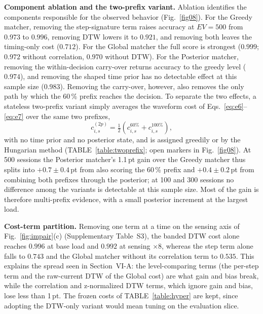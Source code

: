 \documentclass{ieeeaccess}
\newif\ifhighlight \highlightfalse
\DeclareRobustCommand{\revised}[1]{\ifhighlight{\color{blue}#1}\else{\color{.}#1}\fi}
\begin{document}
    \revised{\textbf{Component ablation and the two-prefix variant.}} Ablation identifies the components responsible for the observed behavior (Fig.~\ref{fig08})\revised{.
    For the Greedy matcher, removing the step-signature term raises accuracy at $EV = 500$ from $0.973$ to $0.996$, removing DTW lowers it to $0.921$, and removing both leaves the timing-only cost ($0.712$).
    For the Global matcher the full score is strongest ($0.999$; $0.972$ without correlation, $0.970$ without DTW).
    For the Posterior matcher, removing the within-decision carry-over returns accuracy to the greedy level ($0.974$), and removing the shaped time prior has no detectable effect at this sample size ($0.983$).
    Removing the carry-over, however, also removes the only path by which the 60\,\% prefix reaches the decision.
    To separate the two effects, a stateless two-prefix variant simply averages the waveform cost of Eqs.~\eqref{eq:e6}--\eqref{eq:e7} over the same two prefixes,
    \begin{equation}\label{eq:twoprefix}
        c^{(2p)}_{i,s} = \tfrac{1}{2}\left(c^{60\%}_{i,s} + c^{100\%}_{i,s}\right),
    \end{equation}
    with no time prior and no posterior state, and is assigned greedily or by the Hungarian method (TABLE~\ref{table:twoprefix}; open markers in Fig.~\ref{fig08}).
    At 500 sessions the Posterior matcher's 1.1\,pt gain over the Greedy matcher thus splits into $+0.7 \pm 0.4$\,pt from also scoring the 60\,\% prefix and $+0.4 \pm 0.2$\,pt from combining both prefixes through the posterior; at 100 and 300 sessions no difference among the variants is detectable at this sample size.
    Most of the gain is therefore multi-prefix evidence, with a small posterior increment at the largest load.}

    \revised{\textbf{Cost-term partition.}
    Removing one term at a time on the sensing axis of Fig.~\ref{fig:impair}(c) (Supplementary Table~S3), the banded DTW cost alone reaches $0.996$ at base load and $0.992$ at sensing $\times 8$, whereas the step term alone falls to $0.743$ and the Global matcher without its correlation term to $0.535$.
    This explains the spread seen in Section~VI-A: the level-comparing terms (the per-step term and the raw-current DTW of the Global cost) are what gain and bias break, while the correlation and z-normalized DTW terms, which ignore gain and bias, lose less than 1\,pt.
    The frozen costs of TABLE~\ref{table:hyper} are kept, since adopting the DTW-only variant would mean tuning on the evaluation slice.}
\end{document}
